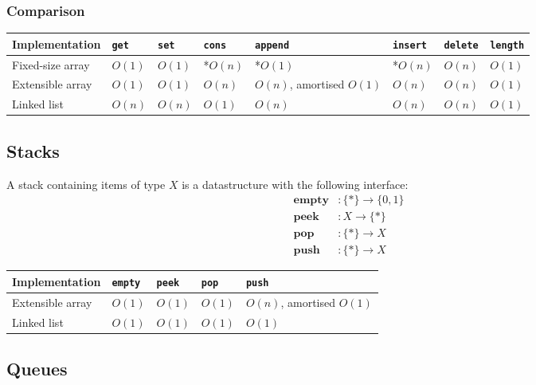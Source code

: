 \documentclass{article}
\begin{document}
\subsubsection{Comparison}

\begin{center}
\begin{tabular}{ l | l | l | l | l | l | l | l }
	\textbf{Implementation} 
	& \texttt{get} 
	& \texttt{set} 
	& \texttt{cons}
	& \texttt{append}
	& \texttt{insert}
	& \texttt{delete}
	& \texttt{length}
	\\
	\hline
	Fixed-size array
	& $O(1)$
	& $O(1)$
	& *$O(n)$
	& *$O(1)$
	& *$O(n)$
	& $O(n)$
	& $O(1)$
	\\
	\hline
	Extensible array
	& $O(1)$
	& $O(1)$
	& $O(n)$
	& $O(n)$, amortised $O(1)$
	& $O(n)$
	& $O(n)$
	& $O(1)$
	\\
	\hline
	Linked list
	& $O(n)$
	& $O(n)$
	& $O(1)$
	& $O(n)$
	& $O(n)$
	& $O(n)$
	& $O(1)$
\end{tabular}
\end{center}

\subsection{Stacks}

\begin{definition}
	A stack containing items of type $X$ is a datastructure with
	the following interface:
	\begin{align*}
		\textbf{empty} &: \{*\}\to\{0, 1\}\\
		\textbf{peek} &: X \to \{*\}\\
		\textbf{pop} &: \{*\}\to X\\
		\textbf{push} &: \{*\}\to X
	\end{align*}
\end{definition}

\begin{center}
\begin{tabular}{ l | l | l | l | l}
	\textbf{Implementation} 
	& \texttt{empty} 
	& \texttt{peek} 
	& \texttt{pop}
	& \texttt{push}
	\\
	\hline
	Extensible array
	& $O(1)$
	& $O(1)$
	& $O(1)$
	& $O(n)$, amortised $O(1)$
	\\
	\hline
	Linked list
	& $O(1)$
	& $O(1)$
	& $O(1)$
	& $O(1)$
\end{tabular}
\end{center}

\subsection{Queues}
\end{document}
